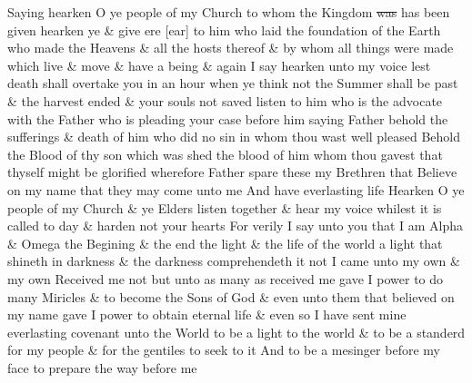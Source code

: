 				Saying hearken O ye people of my Church to whom the Kingdom \sout{was} has been given hearken ye \& give ere [ear] to him who laid the foundation of the Earth who made the Heavens \& all the hosts thereof \& by whom all things were made which live \& move \& have a being \& again I say hearken unto my voice lest death shall overtake you in an hour when ye think not the Summer shall be past \& the harvest ended \& your souls not saved listen to him who is the advocate with the Father who is pleading your case before him saying Father behold the sufferings \& death of him who did no sin in whom thou wast well pleased Behold the Blood of thy son which was shed the blood of him whom thou gavest that thyself might be glorified wherefore Father spare these my Brethren that Believe on my name that they may come unto me And have everlasting life Hearken O ye people of my Church \& ye Elders listen together \& hear my voice whilest it is called to day \& harden not your hearts For verily I say unto you that I am Alpha \& Omega the Begining \& the end the light \& the life of the world a light that shineth in darkness \& the darkness comprehendeth it not I came unto my own \& my own Received me not but unto as many as received me gave I power to do many Miricles \& to become the Sons of God \& even unto them that believed on my name gave I power to obtain eternal life \& even so I have sent mine everlasting covenant unto the World to be a light to the world \& to be a standerd for my people \& for the gentiles to seek to it And to be a mesinger before my face to prepare the way before me
				
